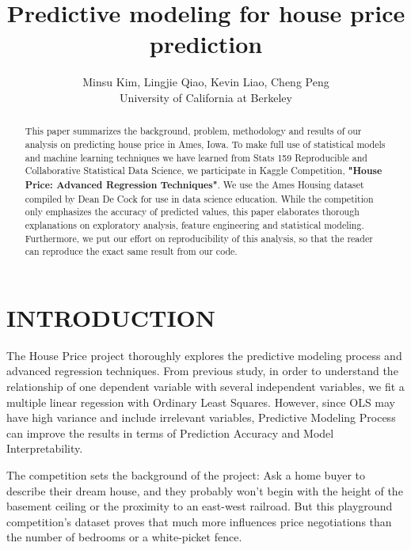 \documentclass[letterpaper, 10 pt, conference]{ieeeconf}  %
\title{\LARGE \bf
Predictive modeling for house price prediction
}
\author{Minsu Kim, Lingjie Qiao, Kevin Liao, Cheng Peng \\
University of California at Berkeley} %
\begin{document}



\maketitle
\thispagestyle{empty}
\pagestyle{empty}


\begin{abstract}

This paper summarizes the background, problem, methodology and results of our analysis on predicting house price in Ames, Iowa. To make full use of statistical models and machine learning techniques we have learned from Stats 159 Reproducible and Collaborative Statistical Data Science, we participate in Kaggle Competition, \textbf{"House Price: Advanced Regression Techniques"}. We use the Ames Housing dataset compiled by Dean De Cock for use in data science education. While the competition only emphasizes the accuracy of predicted values, this paper elaborates thorough explanations on exploratory analysis, feature engineering and statistical modeling. Furthermore, we put our effort on reproducibility of this analysis, so that the reader can reproduce the exact same result from our code.

\end{abstract}


\section{INTRODUCTION}

The House Price project thoroughly explores the predictive modeling process and advanced regression techniques. From previous study, in order to understand the relationship of one dependent variable with several independent variables, we fit a multiple linear regession with Ordinary Least Squares. However, since OLS may have high variance and include irrelevant variables, Predictive Modeling Process can improve the results in terms of Prediction Accuracy and Model Interpretability.

The competition sets the background of the project: Ask a home buyer to describe their dream house, and they probably won't begin with the height of the basement ceiling or the proximity to an east-west railroad. But this playground competition's dataset proves that much more influences price negotiations than the number of bedrooms or a white-picket fence. 
\end{document}
